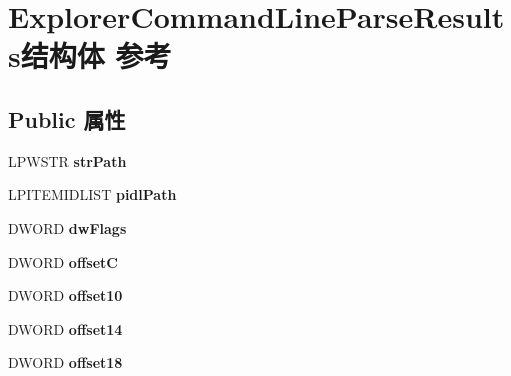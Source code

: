 \hypertarget{struct_explorer_command_line_parse_results}{}\section{Explorer\+Command\+Line\+Parse\+Results结构体 参考}
\label{struct_explorer_command_line_parse_results}
\subsection*{Public 属性}
\begin{DoxyCompactItemize}
\item 
\mbox{\label{struct_explorer_command_line_parse_results_aabf7420e263b69dc9ba677e0cc6cd3c8}} 
L\+P\+W\+S\+TR {\bfseries str\+Path}
\item 
\mbox{\label{struct_explorer_command_line_parse_results_a86028b1ac4bde351cf16eb639390b3ca}} 
L\+P\+I\+T\+E\+M\+I\+D\+L\+I\+ST {\bfseries pidl\+Path}
\item 
\mbox{\label{struct_explorer_command_line_parse_results_a8a3203ab0eaa8db11b8c20c9c46e8a88}} 
D\+W\+O\+RD {\bfseries dw\+Flags}
\item 
\mbox{\label{struct_explorer_command_line_parse_results_ad1fe4daebd038301b0724b940d6ef6cd}} 
D\+W\+O\+RD {\bfseries offsetC}
\item 
\mbox{\label{struct_explorer_command_line_parse_results_ac4b63ca5ac48663b984a198397fc896f}} 
D\+W\+O\+RD {\bfseries offset10}
\item 
\mbox{\label{struct_explorer_command_line_parse_results_ada8c01c9d108278846a7e80a99a5a4ae}} 
D\+W\+O\+RD {\bfseries offset14}
\item 
\mbox{\label{struct_explorer_command_line_parse_results_a2362ed71b13c824fc49fee1cf1e333cd}} 
D\+W\+O\+RD {\bfseries offset18}
\item 
\mbox{\label{struct_explorer_command_line_parse_results_ace259207cebacde4e2ed18c2e79da8bf}} 

\end{DoxyCompactItemize}
